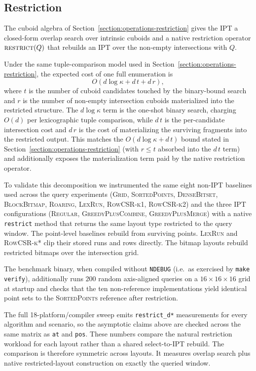 \documentclass[manuscript,screen,review]{acmart}
\theoremstyle{definition}
\theoremstyle{plain}
\begin{document}
\subsection{Restriction}
\label{section:results-selection}

The cuboid algebra of Section~\ref{section:operations-restriction}
gives the IPT a closed-form overlap search over intrinsic cuboids and a
native restriction operator $\textsc{restrict}(Q)$ that rebuilds an
IPT over the non-empty intersections with $Q$.

Under the same tuple-comparison model used in
Section~\ref{section:operations-restriction}, the expected cost of one
full enumeration is
\[
  O(d\log\kappa + d\,t + d\,r),
\]
where $t$ is the number of cuboid candidates touched by the binary-bound
search and $r$ is the number of non-empty intersection cuboids
materialized into the restricted structure. The $d\log\kappa$ term is
the one-shot binary search, charging $O(d)$ per lexicographic tuple
comparison, while $d\,t$ is the per-candidate intersection cost and
$d\,r$ is the cost of materializing the surviving fragments into the
restricted output. This matches the $O(d\log\kappa + d\,t)$ bound stated in
Section~\ref{section:operations-restriction} (with $r\le t$ absorbed
into the $d\,t$ term) and additionally exposes the materialization term
paid by the native restriction operator.

To validate this decomposition we instrumented the same eight non-IPT
baselines used across the query experiments (\textsc{Grid},
\textsc{SortedPoints}, \textsc{DenseBitset}, \textsc{BlockBitmap},
\textsc{Roaring}, \textsc{LexRun}, \textsc{RowCSR-k1},
\textsc{RowCSR-k2}) and the three IPT configurations
(\textsc{Regular}, \textsc{GreedyPlusCombine},
\textsc{GreedyPlusMerge}) with a native \texttt{restrict} method that
returns the same layout type restricted to the query window. The
point-level baselines rebuild from surviving points. \textsc{LexRun}
and \textsc{RowCSR-k*} clip their stored runs and rows directly. The
bitmap layouts rebuild restricted bitmaps over the intersection grid.

The benchmark binary, when
compiled without \texttt{NDEBUG} (i.e.\ as exercised by
\texttt{make verify}), additionally runs $200$ random axis-aligned
queries on a $16\!\times\!16\!\times\!16$ grid at startup and checks
that the ten non-reference implementations yield identical point sets
to the \textsc{SortedPoints} reference after restriction.

The full 18-platform/compiler sweep emits \texttt{restrict\_d*}
measurements for every algorithm and scenario, so the asymptotic
claims above are checked across the same matrix as \texttt{at} and
\texttt{pos}. These numbers compare the natural restriction workload
for each layout rather than a shared select-to-IPT rebuild. The
comparison is therefore symmetric across layouts. It measures overlap
search plus native restricted-layout construction on exactly the
queried window.
\end{document}
